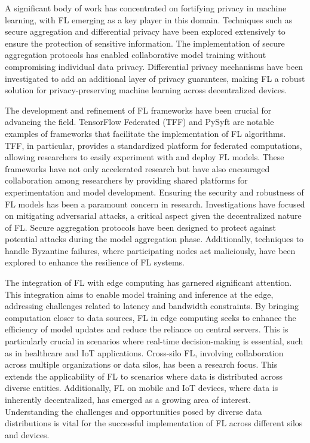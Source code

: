 \documentclass[conference]{IEEEtran}
\begin{document}
A significant body of work has concentrated on fortifying privacy\cite{7} in machine learning, with FL emerging as a key player in this domain. Techniques such as secure aggregation and differential privacy have been explored extensively to ensure the protection of sensitive information. The implementation of secure aggregation protocols has enabled collaborative model training without compromising individual data privacy. Differential privacy mechanisms have been investigated to add an additional layer of privacy guarantees, making FL a robust solution for privacy-preserving machine learning across decentralized devices.

The development and refinement of FL frameworks have been crucial for advancing the field. TensorFlow Federated (TFF) and PySyft are notable examples of frameworks that facilitate the implementation of FL algorithms. TFF, in particular, provides a standardized platform for federated computations, allowing researchers to easily experiment with and deploy FL models. These frameworks have not only accelerated research but have also encouraged collaboration among researchers by providing shared platforms for experimentation and model development. Ensuring the security\cite{8} and robustness of FL models has been a paramount concern in research. Investigations have focused on mitigating adversarial attacks, a critical aspect given the decentralized nature of FL. Secure aggregation protocols have been designed to protect against potential attacks during the model aggregation phase. Additionally, techniques to handle Byzantine failures, where participating nodes act maliciously, have been explored to enhance the resilience of FL systems.


The integration of FL with edge computing\cite{9} has garnered significant attention. This integration aims to enable model training and inference at the edge, addressing challenges related to latency and bandwidth constraints. By bringing computation closer to data sources, FL in edge computing seeks to enhance the efficiency of model updates and reduce the reliance on central servers. This is particularly crucial in scenarios where real-time decision-making is essential, such as in healthcare and IoT applications. Cross-silo FL, involving collaboration across multiple organizations or data silos, has been a research focus. This extends the applicability of FL to scenarios where data is distributed across diverse entities\cite{7}. Additionally, FL on mobile and IoT devices, where data is inherently decentralized, has emerged as a growing area of interest. Understanding the challenges and opportunities posed by diverse data distributions is vital for the successful implementation of FL across different silos and devices.
\end{document}
